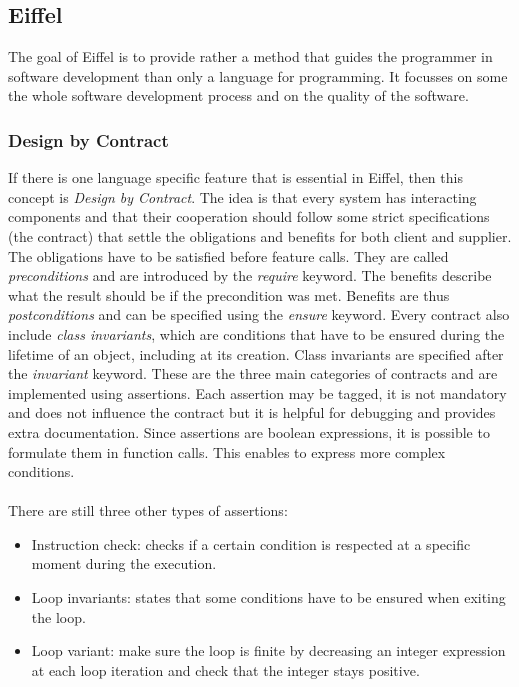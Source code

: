 \documentclass[12pt,a4paper,twocolumn]{article}
\begin{document}
\subsection{Eiffel}
The goal of Eiffel is to provide rather a method that guides the programmer in software development than only a language for programming. It focusses on some the whole software development process and on the quality of the software. 
\subsubsection{Design by Contract}
If there is one language specific feature that is essential in Eiffel, then this concept is \emph{Design by Contract}\cite{meyer2001eiffel, eiffelEssentials}. The idea is that every system has interacting components and that their cooperation should follow some strict specifications (the contract) that settle the obligations and benefits for both client and supplier. The obligations have to be satisfied before feature calls. They are called \emph{preconditions} and are introduced by the \emph{require} keyword. The benefits describe what the result should be if the precondition was met. Benefits are thus \emph{postconditions} and can be specified using the \emph{ensure} keyword. Every contract also include \emph{class invariants}, which are conditions that have to be ensured during the lifetime of an object, including at its creation. Class invariants are specified after the \emph{invariant} keyword. These are the three main categories of contracts and are implemented using assertions. Each assertion may be tagged, it is not mandatory and does not influence the contract but it is helpful for debugging and provides extra documentation. Since assertions are boolean expressions, it is possible to formulate them in function calls. This enables to express more complex conditions.
\\
\\
There are still three other types of assertions: 
\begin{itemize}
\item Instruction check: checks if a certain condition is respected at a specific moment during the execution.
\item Loop invariants: states that some conditions have to be ensured when exiting the loop.
\item Loop variant: make sure the loop is finite by decreasing an integer expression at each loop iteration and check that the integer stays positive.
\end{itemize}
\end{document}

